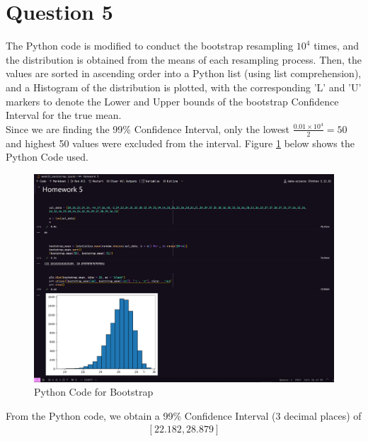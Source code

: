 \documentclass[12pt]{article}
\begin{document}
\newpage

\section*{Question 5}

The Python code is modified to conduct the bootstrap resampling $10^{4}$ times, and the distribution is obtained from the means of each resampling process. Then, the values are sorted in ascending order into a Python list (using list comprehension), and a Histogram of the distribution is plotted, with the corresponding 'L' and 'U' markers to denote the Lower and Upper bounds of the bootstrap Confidence Interval for the true mean. \\ 

\noindent Since we are finding the 99\% Confidence Interval, only the lowest $ \frac{0.01 \times 10^{4}}{2} = 50 $ and highest 50 values were excluded from the interval. Figure \ref{fig:5-bootstrap} below shows the Python Code used.

\begin{figure}[H]
    \centering
    \includegraphics[width=\textwidth]{Images/Q5Bootstrap.png}
    \caption{Python Code for Bootstrap}
    \label{fig:5-bootstrap}
\end{figure} 

\noindent From the Python code, we obtain a 99\% Confidence Interval (3 decimal places) of \begin{align*}
    \left[ 22.182, 28.879 \right]
\end{align*}
\end{document}
